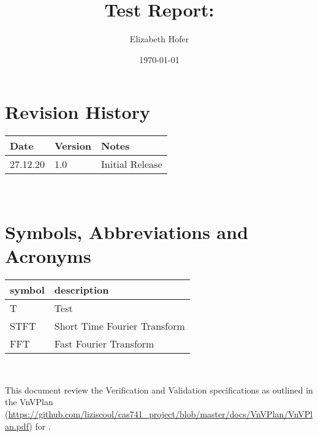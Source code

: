 \documentclass[12pt, titlepage]{article}
\begin{document}
\title{Test Report: \progname{}} 
\author{Elizabeth Hofer}
\date{\today}
	
\maketitle


\section{Revision History}

\begin{tabularx}{\textwidth}{p{3cm}p{2cm}X}
\toprule {\bf Date} & {\bf Version} & {\bf Notes}\\
\midrule
27.12.20 & 1.0 & Initial Release\\
\bottomrule
\end{tabularx}

~\newpage

\section{Symbols, Abbreviations and Acronyms}

\renewcommand{\arraystretch}{1.2}
\begin{tabular}{l l} 
  \toprule		
  \textbf{symbol} & \textbf{description}\\
  \midrule 
  T & Test\\
  STFT & Short Time Fourier Transform\\
  FFT & Fast Fourier Transform\\
  \bottomrule
\end{tabular}\\


\newpage

\tableofcontents

\listoftables %

\listoffigures %

\newpage


This document review the Verification and Validation specifications as outlined in the VnVPlan (\url{https://github.com/liziscool/cas741_project/blob/master/docs/VnVPlan/VnVPlan.pdf}) for \progname{}. 
\end{document}
